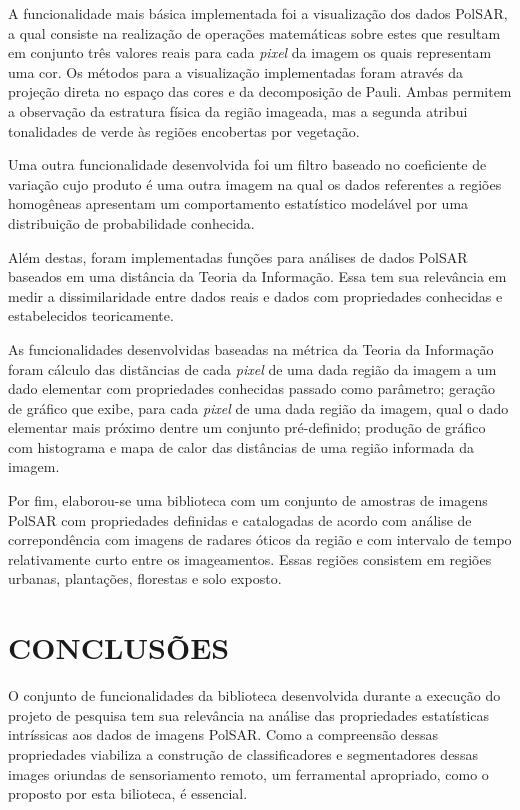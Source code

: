 \documentclass[12pt,letterpaper]{article}
\begin{document}
A funcionalidade mais básica implementada foi a visualização dos dados PolSAR, a qual consiste na realização de operações matemáticas sobre estes que resultam em conjunto três valores reais para cada \textit{pixel} da imagem os quais representam uma cor. Os métodos para a visualização implementadas foram através da projeção direta no espaço das cores e da decomposição de Pauli. Ambas permitem a observação da estratura física da região imageada, mas a segunda atribui tonalidades de verde às regiões encobertas por vegetação. 

Uma outra funcionalidade desenvolvida foi um filtro baseado no coeficiente de variação cujo produto é uma outra imagem na qual os dados referentes a regiões homogêneas apresentam um comportamento estatístico modelável por uma distribuição de probabilidade conhecida.

Além destas, foram implementadas funções para análises de dados PolSAR baseados em uma distância da Teoria da Informação. Essa tem sua relevância em medir a dissimilaridade entre dados reais e dados com propriedades conhecidas e estabelecidos teoricamente. 

As funcionalidades desenvolvidas baseadas na métrica da Teoria da Informação foram cálculo das distãncias de cada \textit{pixel} de uma dada região da imagem a um dado elementar com propriedades conhecidas passado como parâmetro; geração de gráfico que exibe, para cada \textit{pixel} de uma dada região da imagem, qual o dado elementar mais próximo dentre um conjunto pré-definido; produção de gráfico com histograma e mapa de calor das distâncias de uma região informada da imagem. 

Por fim, elaborou-se uma biblioteca com um conjunto de amostras de imagens PolSAR com propriedades definidas e catalogadas de acordo com análise de correpondência com imagens de radares óticos da região e com intervalo de tempo relativamente curto entre os imageamentos. Essas regiões consistem em regiões urbanas, plantações, florestas e solo exposto.

  
  \newpage
\section*{\centering \textbf{CONCLUSÕES}} %

O conjunto de funcionalidades da biblioteca desenvolvida durante a execução do projeto de pesquisa tem sua relevância na análise das propriedades estatísticas intríssicas aos dados de imagens PolSAR. Como a compreensão dessas propriedades viabiliza a construção de classificadores e segmentadores dessas images oriundas de sensoriamento remoto, um ferramental apropriado, como o proposto por esta bilioteca, é essencial.
\end{document}
